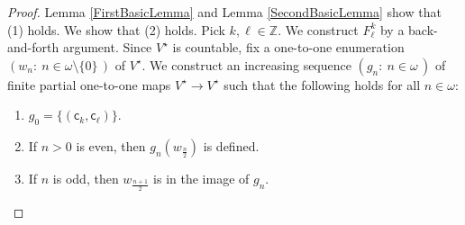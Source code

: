 \documentclass[10pt,a4paper, openany,  oldfontcommands]{memoir}
\newtheorem{open problem} [theorem] {Open Problem}
\begin{document}
\begin{proof}


Lemma  \ref{FirstBasicLemma}  and  Lemma \ref{SecondBasicLemma}  show that    (1) holds. 
We show that (2) holds. 
Pick   $   k, \ell  \in  \mathbb{Z} $.   
We construct    $  F^k_{  \ell  }    $  by  a back-and-forth argument. 
Since  $  V^{  \star }  $  is countable,  fix   a   one-to-one enumeration   
 $   \left(  w_n  :   \   n   \in  \omega \setminus  \lbrace 0  \rbrace   \,   \right)  $ of  $  V^{  \star }  $. 
We construct an increasing sequence  $  \left(   g_n :    \     n  \in   \omega   \,  \right)  $ of finite partial    one-to-one maps  $    V^{  \star }   \to   V^{  \star }   $  such that
the following holds for all $  n  \in  \omega  $:  
\begin{enumerate}
\item  $  g_0   =  \lbrace   \left(  \mathsf{c}_k  ,  \mathsf{c}_{  \ell  }   \right)    \rbrace  $. 

\item  If  $n  >0 $  is even,  then  $  g_n  \left(  w_{  \frac{n}{2} }   \right)  $  is defined. 


\item  If  $n$  is odd,  then  $    w_{  \frac{n+1}{2}  }    $  is  in the image of  $  g_n  $. 



\end{enumerate}
\end{proof}
\end{document}
